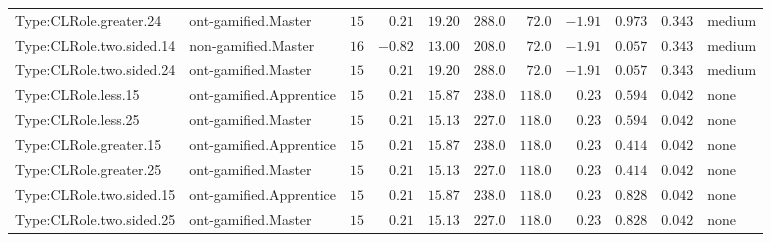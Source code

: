 \documentclass[6pt,a4paper]{article}
\begin{document}
{\begin{longtable}{llrrrrrrrrl}
Type:CLRole.greater.24&ont-gamified.Master&$15$&$ 0.21$&$19.20$&$ 288.0$&$ 72.0$&$-1.91$&$0.973$&$0.343$&medium\tabularnewline
Type:CLRole.two.sided.14&non-gamified.Master&$16$&$-0.82$&$13.00$&$ 208.0$&$ 72.0$&$-1.91$&$0.057$&$0.343$&medium\tabularnewline
Type:CLRole.two.sided.24&ont-gamified.Master&$15$&$ 0.21$&$19.20$&$ 288.0$&$ 72.0$&$-1.91$&$0.057$&$0.343$&medium\tabularnewline
Type:CLRole.less.15&ont-gamified.Apprentice&$15$&$ 0.21$&$15.87$&$ 238.0$&$118.0$&$ 0.23$&$0.594$&$0.042$&none\tabularnewline
Type:CLRole.less.25&ont-gamified.Master&$15$&$ 0.21$&$15.13$&$ 227.0$&$118.0$&$ 0.23$&$0.594$&$0.042$&none\tabularnewline
Type:CLRole.greater.15&ont-gamified.Apprentice&$15$&$ 0.21$&$15.87$&$ 238.0$&$118.0$&$ 0.23$&$0.414$&$0.042$&none\tabularnewline
Type:CLRole.greater.25&ont-gamified.Master&$15$&$ 0.21$&$15.13$&$ 227.0$&$118.0$&$ 0.23$&$0.414$&$0.042$&none\tabularnewline
\newpage
Type:CLRole.two.sided.15&ont-gamified.Apprentice&$15$&$ 0.21$&$15.87$&$ 238.0$&$118.0$&$ 0.23$&$0.828$&$0.042$&none\tabularnewline
Type:CLRole.two.sided.25&ont-gamified.Master&$15$&$ 0.21$&$15.13$&$ 227.0$&$118.0$&$ 0.23$&$0.828$&$0.042$&none\tabularnewline
\hline
\end{longtable}}
\end{document}
